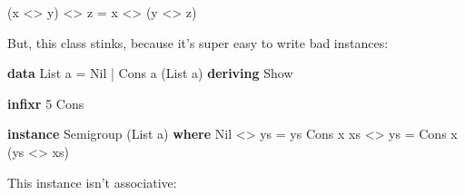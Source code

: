 \documentclass[]{article}
\newenvironment{Shaded}{}{}
\newcommand{\DataTypeTok}[1]{\textcolor[rgb]{0.56,0.13,0.00}{#1}}
\newcommand{\DecValTok}[1]{\textcolor[rgb]{0.25,0.63,0.44}{#1}}
\newcommand{\KeywordTok}[1]{\textcolor[rgb]{0.00,0.44,0.13}{\textbf{#1}}}
\newcommand{\NormalTok}[1]{#1}
\newcommand{\OperatorTok}[1]{\textcolor[rgb]{0.40,0.40,0.40}{#1}}
\newcommand{\OtherTok}[1]{\textcolor[rgb]{0.00,0.44,0.13}{#1}}
\begin{document}
\begin{Shaded}
\begin{Highlighting}[]
\NormalTok{(x }\OperatorTok{\textless{}\textgreater{}}\NormalTok{ y) }\OperatorTok{\textless{}\textgreater{}}\NormalTok{ z }\OtherTok{=}\NormalTok{ x }\OperatorTok{\textless{}\textgreater{}}\NormalTok{ (y }\OperatorTok{\textless{}\textgreater{}}\NormalTok{ z)}
\end{Highlighting}
\end{Shaded}

But, this class stinks, because it's super easy to write bad instances:

\begin{Shaded}
\begin{Highlighting}[]
\KeywordTok{data} \DataTypeTok{List}\NormalTok{ a }\OtherTok{=} \DataTypeTok{Nil} \OperatorTok{|} \DataTypeTok{Cons}\NormalTok{ a (}\DataTypeTok{List}\NormalTok{ a)}
    \KeywordTok{deriving} \DataTypeTok{Show}

\KeywordTok{infixr} \DecValTok{5} \OtherTok{\textasciigrave{}Cons\textasciigrave{}}

\KeywordTok{instance} \DataTypeTok{Semigroup}\NormalTok{ (}\DataTypeTok{List}\NormalTok{ a) }\KeywordTok{where}
    \DataTypeTok{Nil}       \OperatorTok{\textless{}\textgreater{}}\NormalTok{ ys }\OtherTok{=}\NormalTok{ ys}
    \DataTypeTok{Cons}\NormalTok{ x xs }\OperatorTok{\textless{}\textgreater{}}\NormalTok{ ys }\OtherTok{=} \DataTypeTok{Cons}\NormalTok{ x (ys }\OperatorTok{\textless{}\textgreater{}}\NormalTok{ xs)}
\end{Highlighting}
\end{Shaded}

This instance isn't associative:
\end{document}
